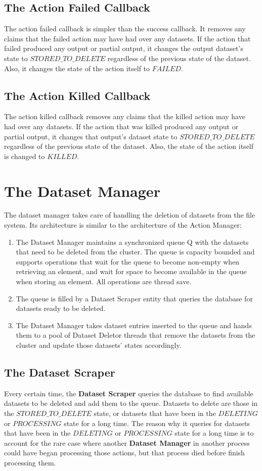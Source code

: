 \subsection{The Action Failed Callback}
The action failed callback is simpler than the success callback. It removes any claims that the failed action may have had over any datasets. If the action that failed produced any output or partial output, it changes the output dataset's state to $STORED\_TO\_DELETE$ regardless of the previous state of the dataset. Also, it changes the state of the action itself to $FAILED$.

\subsection{The Action Killed Callback}
The action killed callback removes any claims that the killed action may have had over any datasets. If the action that was killed produced any output or partial output, it changes that output's dataset state to $STORED\_TO\_DELETE$ regardless of the previous state of the dataset. Also, the state of the action itself is changed to $KILLED$.

\section{The Dataset Manager}
The dataset manager takes care of handling the deletion of datasets from the file system. Its architecture is similar to the architecture of the Action Manager:

\begin{enumerate}
\item The Dataset Manager maintains a synchronized queue Q with the datasets that need to be deleted from the cluster. The queue is capacity bounded and supports operations that wait for the queue to become non-empty when retrieving an element, and wait for space to become available in the queue when storing an element. All operations are thread save.
\item The queue is filled by a Dataset Scraper entity that queries the database for datasets ready to be deleted.
\item The Dataset Manager takes dataset entries inserted to the queue and hands them to a pool of Dataset Deletor threads that remove the datasets from the cluster and update those datasets' states accordingly.
\end{enumerate}

\subsection{The Dataset Scraper}
Every certain time, the \textbf{Dataset Scraper} queries the database to find available datasets to be deleted and add them to the queue. Datasets to delete are those in the $STORED\_TO\_DELETE$ state, or datasets that have been in the $DELETING$ or $PROCESSING$ state for a long time. The reason why it queries for datasets that have been in the $DELETING$ or $PROCESSING$ state for a long time is to account for the rare case where another \textbf{Dataset Manager} in another process could have began processing those actions, but that process died before finish processing them.

